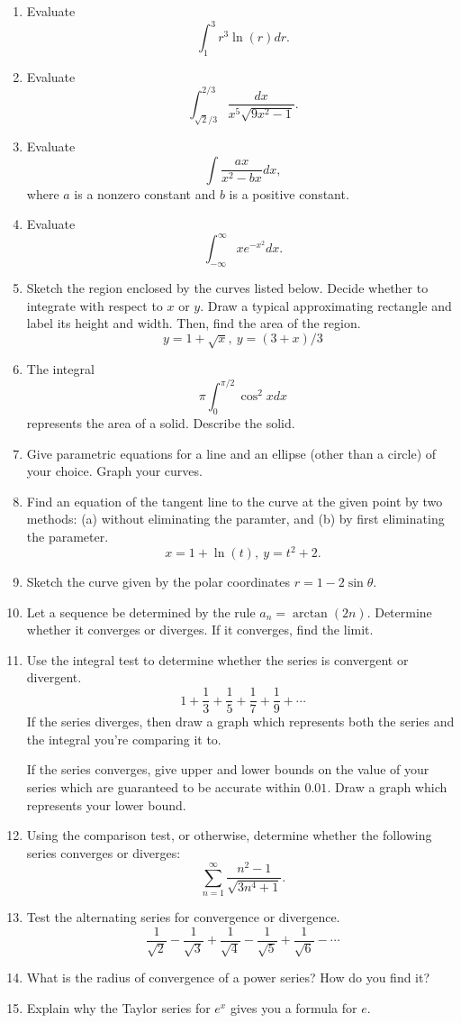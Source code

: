 \documentclass[12pt]{article}
\begin{document}
\begin{enumerate}[(1)]
\item
Evaluate
\[
\int_1^3 r^3 \ln(r) dr.
\]
\item
Evaluate
\[
\int_{\sqrt{2}/3}^{2/3} \frac{dx}{x^5 \sqrt{9x^2 - 1}}.
\]
\item
Evaluate
\[
\int \frac{ax}{x^2 - bx} dx,
\]
where $a$ is a nonzero constant and $b$ is a positive constant.
\item
Evaluate
\[
\int_{- \infty}^{\infty} xe^{-x^2} dx.
\]
\item
Sketch the region enclosed by the curves listed below. Decide whether to integrate with
respect to $x$ or $y$. Draw a typical approximating rectangle and label its height and width. Then,
find the area of the region.
\[
y = 1 + \sqrt{x}, \ y = (3 + x)/3
\]
\item
The integral
\[
\pi \int_0^{\pi/2} \cos^2 x dx
\]
represents the area of a solid. Describe the solid.
\item
Give parametric equations for a line and an ellipse (other than a circle) of your choice.
Graph your curves.
\item
Find an equation of the tangent line to the curve at the given point by two methods: (a)
without eliminating the paramter, and (b) by first eliminating the parameter.
\[
x  = 1 + \ln(t), \ y = t^2 + 2.
\]
\item
Sketch the curve given by the polar coordinates $r = 1 - 2 \sin \theta$.
\item
Let a sequence be determined by the rule $a_n = \arctan(2n)$. Determine whether it converges
or diverges. If it converges, find the limit.
\item
Use the integral test to determine whether the series is convergent or divergent.
\[
1 + \frac{1}{3} + \frac{1}{5} + \frac{1}{7} + \frac{1}{9} + \cdots
\]
If the series diverges, then draw a graph which
represents both the series and the integral you're comparing it to.

If the series converges, give upper and lower bounds on the value of your series
which are guaranteed to be accurate within $0.01$. Draw a graph which represents your
lower bound.
\item
Using the comparison test, or otherwise, determine whether the following series converges or diverges:
\[
\sum_{n = 1}^{\infty} \frac{n^2 - 1}{\sqrt{3n^4 + 1}}.
\]
\item
Test the alternating series for convergence or divergence.
\[
\frac{1}{\sqrt{2}} - \frac{1}{\sqrt{3}} + \frac{1}{\sqrt{4}} - \frac{1}{\sqrt{5}} + \frac{1}{\sqrt{6}} - \cdots
\]
\item
What is the radius of convergence of a power series? How do you find it?
\item
Explain why the Taylor series for $e^x$ gives you a formula for $e$.
\end{enumerate}
\end{document}

